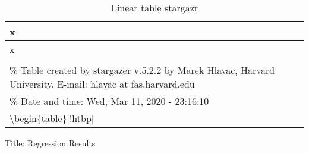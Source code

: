 \documentclass[]{article}
\begin{document}
\begin{longtable}[]{@{}l@{}}
\caption{Linear table stargazr}\tabularnewline
\toprule
\begin{minipage}[b]{0.97\columnwidth}\raggedright
x\strut
\end{minipage}\tabularnewline
\midrule
\endfirsthead
\toprule
\begin{minipage}[b]{0.97\columnwidth}\raggedright
x\strut
\end{minipage}\tabularnewline
\midrule
\endhead
\begin{minipage}[t]{0.97\columnwidth}\raggedright
\strut
\end{minipage}\tabularnewline
\begin{minipage}[t]{0.97\columnwidth}\raggedright
\% Table created by stargazer v.5.2.2 by Marek Hlavac, Harvard
University. E-mail: hlavac at fas.harvard.edu\strut
\end{minipage}\tabularnewline
\begin{minipage}[t]{0.97\columnwidth}\raggedright
\% Date and time: Wed, Mar 11, 2020 - 23:16:10\strut
\end{minipage}\tabularnewline
\begin{minipage}[t]{0.97\columnwidth}\raggedright
\textbackslash{}begin\{table\}{[}!htbp{]} \centering\strut
\end{minipage}\tabularnewline
\bottomrule
\end{longtable}

\textbar{}

\caption{Title: Regression Results}

\textbar{}\label{} \textbar{} \textbar{}
\end{document}

